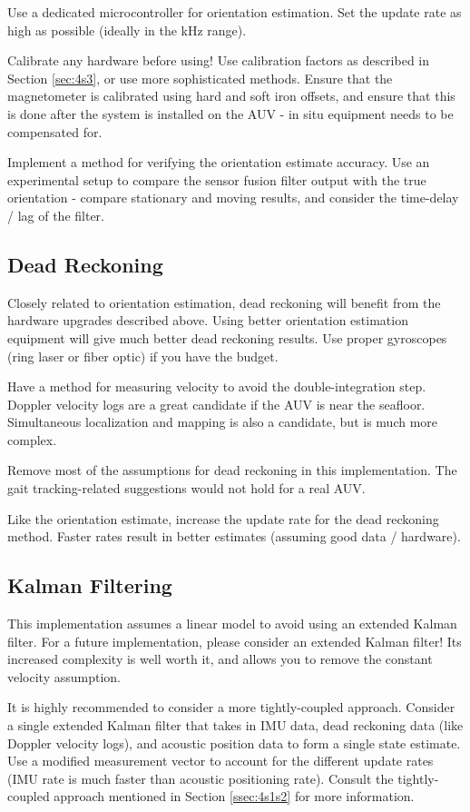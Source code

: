 \documentclass[12pt,a4paper]{report}
\begin{document}
Use a dedicated microcontroller for orientation estimation. Set the update rate as high as possible (ideally in the kHz range).

Calibrate any hardware before using! Use calibration factors as described in Section \ref{sec:4s3}, or use more sophisticated methods. Ensure that the magnetometer is calibrated using hard and soft iron offsets, and ensure that this is done after the system is installed on the AUV - in situ equipment needs to be compensated for.

Implement a method for verifying the orientation estimate accuracy. Use an experimental setup to compare the sensor fusion filter output with the true orientation - compare stationary and moving results, and consider the time-delay / lag of the filter.

\subsection{Dead Reckoning} \label{sec:7s1s5}
Closely related to orientation estimation, dead reckoning will benefit from the hardware upgrades described above. Using better orientation estimation equipment will give much better dead reckoning results. Use proper gyroscopes (ring laser or fiber optic) if you have the budget.

Have a method for measuring velocity to avoid the double-integration step. Doppler velocity logs are a great candidate if the AUV is near the seafloor. Simultaneous localization and mapping is also a candidate, but is much more complex.

Remove most of the assumptions for dead reckoning in this implementation. The gait tracking-related suggestions would not hold for a real AUV.

Like the orientation estimate, increase the update rate for the dead reckoning method. Faster rates result in better estimates (assuming good data / hardware).

\subsection{Kalman Filtering} \label{sec:7s1s6}
This implementation assumes a linear model to avoid using an extended Kalman filter. For a future implementation, please consider an extended Kalman filter! Its increased complexity is well worth it, and allows you to remove the constant velocity assumption.

It is highly recommended to consider a more tightly-coupled approach. Consider a single extended Kalman filter that takes in IMU data, dead reckoning data (like Doppler velocity logs), and acoustic position data to form a single state estimate. Use a modified measurement vector to account for the different update rates (IMU rate is much faster than acoustic positioning rate). Consult the tightly-coupled approach mentioned in Section \ref{ssec:4s1s2} for more information.
\end{document}
